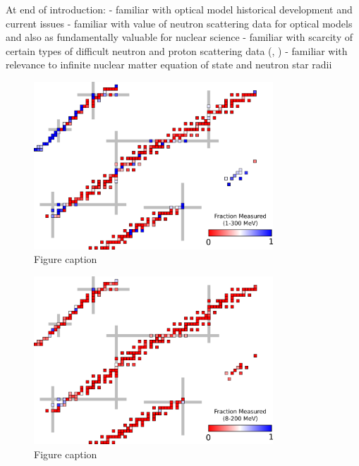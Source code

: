 At end of introduction:
- familiar with optical model historical development and current issues
- familiar with value of neutron scattering data for optical models and also as
fundamentally valuable for nuclear science
- familiar with scarcity of certain types of difficult neutron and proton
scattering data (\tot, \rxnE)
- familiar with relevance to infinite nuclear matter equation of state and
neutron star radii

\begin{figure}
    \includegraphics[width=0.8\textwidth]{figures/TCSChart.png}
    \caption{Figure caption}
    \label{chart}
\end{figure}

\begin{figure}
    \includegraphics[width=0.8\textwidth]{figures/RCSChart.png}
    \caption{Figure caption}
    \label{chart}
\end{figure}


%

